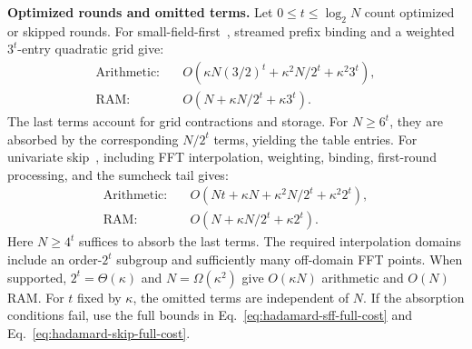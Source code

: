 \smallskip\noindent\textbf{Optimized rounds and omitted terms.}
Let \(0\leq t\leq\log_2N\) count optimized or skipped rounds.
For small-field-first~\cite{iacr/BagadDT24,iacr/BagadDDT25,iacr/DaoDBDT26},
streamed prefix binding and a weighted \(3^t\)-entry quadratic grid give:
\begin{equation}
\begin{aligned}
\text{Arithmetic:}\quad&
O\!\left(\kappa N(3/2)^t+\kappa^2N/2^t+\kappa^2 3^t\right),\\
\text{RAM:}\quad& O\!\left(N+\kappa N/2^t+\kappa 3^t\right).
\end{aligned}
\label{eq:hadamard-sff-full-cost}
\end{equation}
The last terms account for grid contractions and storage.
For \(N\geq6^t\), they are absorbed by the corresponding
\(N/2^t\) terms, yielding the table entries.
For univariate skip~\cite{iacr/Gruen24}, including FFT interpolation,
weighting, binding, first-round processing, and the sumcheck tail gives:
\begin{equation}
\begin{aligned}
\text{Arithmetic:}\quad&
O\!\left(Nt+\kappa N+\kappa^2N/2^t+\kappa^2 2^t\right),\\
\text{RAM:}\quad& O\!\left(N+\kappa N/2^t+\kappa 2^t\right).
\end{aligned}
\label{eq:hadamard-skip-full-cost}
\end{equation}
Here \(N\geq4^t\) suffices to absorb the last terms.
The required interpolation domains include an order-\(2^t\) subgroup
and sufficiently many off-domain FFT points. When supported,
\(2^t=\Theta(\kappa)\) and \(N=\Omega(\kappa^2)\) give
\(O(\kappa N)\) arithmetic and \(O(N)\) RAM.
For \(t\) fixed by \(\kappa\), the omitted terms are independent of
\(N\). If the absorption conditions fail, use the full bounds in
Eq.~\eqref{eq:hadamard-sff-full-cost} and
Eq.~\eqref{eq:hadamard-skip-full-cost}.

